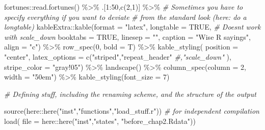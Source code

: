 \documentclass[
]{article}
\newenvironment{Shaded}{\begin{snugshade}}{\end{snugshade}}
\newcommand{\AttributeTok}[1]{\textcolor[rgb]{0.77,0.63,0.00}{#1}}
\newcommand{\CommentTok}[1]{\textcolor[rgb]{0.56,0.35,0.01}{\textit{#1}}}
\newcommand{\ConstantTok}[1]{\textcolor[rgb]{0.00,0.00,0.00}{#1}}
\newcommand{\DecValTok}[1]{\textcolor[rgb]{0.00,0.00,0.81}{#1}}
\newcommand{\FunctionTok}[1]{\textcolor[rgb]{0.00,0.00,0.00}{#1}}
\newcommand{\NormalTok}[1]{#1}
\newcommand{\SpecialCharTok}[1]{\textcolor[rgb]{0.00,0.00,0.00}{#1}}
\newcommand{\StringTok}[1]{\textcolor[rgb]{0.31,0.60,0.02}{#1}}
\begin{document}
\begin{Shaded}
\begin{Highlighting}[]
\NormalTok{fortunes}\SpecialCharTok{::}\FunctionTok{read.fortunes}\NormalTok{() }\SpecialCharTok{\%\textgreater{}\%} 
\NormalTok{  .[}\DecValTok{1}\SpecialCharTok{:}\DecValTok{50}\NormalTok{,}\FunctionTok{c}\NormalTok{(}\DecValTok{2}\NormalTok{,}\DecValTok{1}\NormalTok{)] }\SpecialCharTok{\%\textgreater{}\%}
  \CommentTok{\# Sometimes you have to specify everything if you want to deviate}
  \CommentTok{\# from the standard look (here: do a longtable)}
\NormalTok{  kableExtra}\SpecialCharTok{::}\FunctionTok{kable}\NormalTok{(}\AttributeTok{format =} \StringTok{"latex"}\NormalTok{,}
                    \AttributeTok{longtable =} \ConstantTok{TRUE}\NormalTok{, }\CommentTok{\# Doesn\textquotesingle{}t work with scale\_down}
                    \AttributeTok{booktabs =} \ConstantTok{TRUE}\NormalTok{,}
                    \AttributeTok{linesep =} \StringTok{""}\NormalTok{,}
                    \AttributeTok{caption =} \StringTok{"Wise R sayings"}\NormalTok{,}
                    \AttributeTok{align =} \StringTok{"c"}\NormalTok{) }\SpecialCharTok{\%\textgreater{}\%}
  \FunctionTok{row\_spec}\NormalTok{(}\DecValTok{0}\NormalTok{, }\AttributeTok{bold =}\NormalTok{ T) }\SpecialCharTok{\%\textgreater{}\%}
  \FunctionTok{kable\_styling}\NormalTok{( }\AttributeTok{position =} \StringTok{"center"}\NormalTok{,}
                 \AttributeTok{latex\_options =} \FunctionTok{c}\NormalTok{(}\StringTok{"striped"}\NormalTok{,}\StringTok{"repeat\_header"}
                                   \CommentTok{\#,"scale\_down"}
\NormalTok{                                   ),}
                 \AttributeTok{stripe\_color =} \StringTok{"gray!05"}\NormalTok{) }\SpecialCharTok{\%\textgreater{}\%}
  \FunctionTok{landscape}\NormalTok{() }\SpecialCharTok{\%\textgreater{}\%}
  \FunctionTok{column\_spec}\NormalTok{(}\AttributeTok{column =} \DecValTok{2}\NormalTok{, }\AttributeTok{width =} \StringTok{"50em"}\NormalTok{) }\SpecialCharTok{\%\textgreater{}\%}
  \FunctionTok{kable\_styling}\NormalTok{(}\AttributeTok{font\_size =} \DecValTok{7}\NormalTok{)}



\CommentTok{\# Defining stuff, including the renaming scheme, and the structure of the output}


\FunctionTok{source}\NormalTok{(here}\SpecialCharTok{::}\FunctionTok{here}\NormalTok{(}\StringTok{"inst"}\NormalTok{,}\StringTok{"functions"}\NormalTok{,}\StringTok{"load\_stuff.r"}\NormalTok{)) }\CommentTok{\# for independent compilation}
\FunctionTok{load}\NormalTok{( }\AttributeTok{file =}\NormalTok{ here}\SpecialCharTok{::}\FunctionTok{here}\NormalTok{(}\StringTok{"inst"}\NormalTok{,}\StringTok{"states"}\NormalTok{, }\StringTok{"before\_chap2.Rdata"}\NormalTok{))}


\end{Highlighting}
\end{Shaded}
\end{document}
